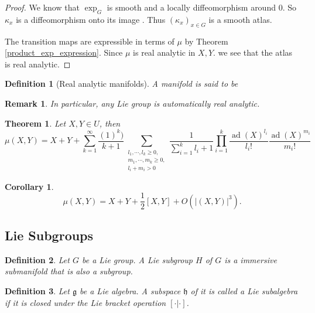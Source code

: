 \documentclass{article}
\newtheorem{theorem}{Theorem}[section]
\newtheorem{definition}{Definition}[section]
\newtheorem{remark}{Remark}[section]
\newtheorem{corollary}{Corollary}[section]
\numberwithin{equation}{section}
\DeclareMathOperator{\ad}{ad}
\begin{document}
\begin{proof}
We know that $\exp_G$ is smooth and a locally diffeomorphism around $0$. So $\kappa_x$ is a diffeomorphism onto its image . Thus $(\kappa_x)_{x\in G}$ is a smooth atlas.\\
\par The transition maps are expressible in terms of $\mu$ by Theorem \ref{product_exp_expression}. Since $\mu$ is real analytic in $X,Y$. we see that the atlas is real analytic.
\end{proof}

\begin{definition}[Real analytic manifolds]
A manifold is said to be%
\end{definition}

\begin{remark}
In particular, any Lie group is automatically real analytic.
\end{remark}

\begin{theorem}
Let $X,Y\in U$, then 
\begin{equation*}
\mu(X, Y) = X+Y+\sum_{k=1}^\infty {\frac {(1)^k)} {k+1}}\sum_{\substack{l_1,\cdots,l_k\geq0,\\m_1, \cdots,m_k\geq0,\\l_i+m_i>0}}
{\frac 1 {\sum_{i=1}^k l_i +1}}\prod_{i=1}^k{\frac {\ad(X)^{l_i}} {l_i!}}{\frac {\ad(X)^{m_i}} {m_i!}}
\end{equation*}
\end{theorem}

\begin{corollary}
\begin{equation*}
\mu(X,Y)=X+Y+{\frac 1 2}[X,Y]+O(|(X,Y)|^3).
\end{equation*}
\end{corollary}

\subsection{Lie Subgroups}

\begin{definition}
Let $G$ be a Lie group. A Lie subgroup $H$ of $G$ is a immersive submanifold that is also a subgroup.
\end{definition}

\begin{definition}
Let $\mathfrak{g}$ be a Lie algebra. A subspace $\mathfrak{h}$ of it is called a Lie subalgebra if it is closed under the Lie bracket operation $[\cdot|\cdot]$.
\end{definition}
\end{document}
